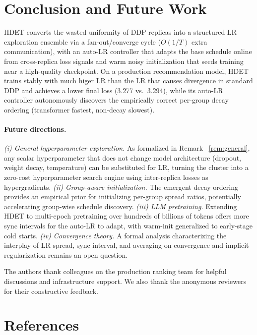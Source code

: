 \documentclass{article}
\begin{document}
\section{Conclusion and Future Work}
\label{sec:conclusion}

HDET converts the wasted uniformity of DDP replicas into a structured LR
exploration ensemble via a fan-out/converge cycle ($O(1/T)$ extra communication),
with an auto-LR controller that adapts the base schedule online from cross-replica
loss signals and warm noisy initialization that seeds training near a high-quality
checkpoint.
On a production recommendation model, HDET trains stably with much higer LR than the LR that
causes divergence in standard DDP and achieves a lower final loss (3.277 vs.\
3.294), while its auto-LR controller autonomously discovers the empirically correct
per-group decay ordering (transformer fastest, non-decay slowest).

\paragraph{Future directions.}
\textit{(i) General hyperparameter exploration.}
As formalized in Remark ~\ref{rem:general}, any scalar hyperparameter that does not
change model architecture (dropout, weight decay, temperature) can be substituted
for LR, turning the cluster into a zero-cost hyperparameter search engine using
inter-replica losses as hypergradients.
\textit{(ii) Group-aware initialization.}
The emergent decay ordering provides an empirical prior for initializing per-group
spread ratios, potentially accelerating group-wise schedule discovery.
\textit{(iii) LLM pretraining.}
Extending HDET to multi-epoch pretraining over hundreds of billions of tokens
offers more sync intervals for the auto-LR to adapt, with warm-init generalized to
early-stage cold starts.
\textit{(iv) Convergence theory.}
A formal analysis characterizing the interplay of LR spread, sync interval, and
averaging on convergence and implicit regularization remains an open question.

\begin{ack}
The authors thank colleagues on the production ranking team for helpful
discussions and infrastructure support.  We also thank the anonymous reviewers
for their constructive feedback.
\end{ack}

\section*{References}





\appendix


\newpage

\end{document}
